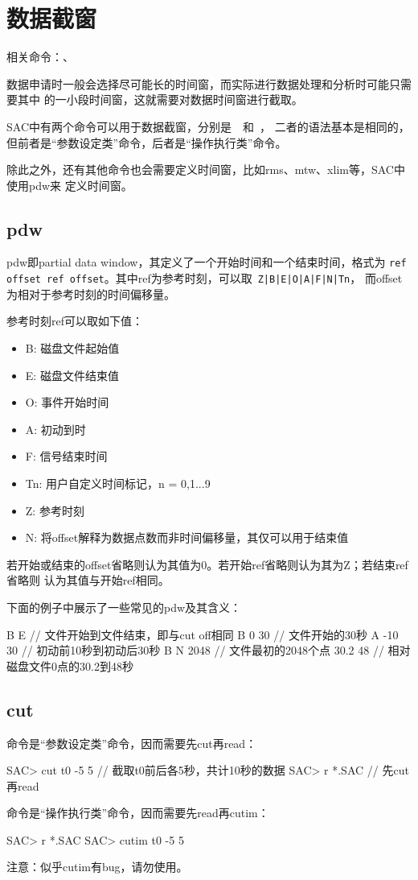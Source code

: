 \section{数据截窗}
相关命令：、

数据申请时一般会选择尽可能长的时间窗，而实际进行数据处理和分析时可能只需要其中
的一小段时间窗，这就需要对数据时间窗进行截取。

SAC中有两个命令可以用于数据截窗，分别是~~和~，
二者的语法基本是相同的，但前者是``参数设定类''命令，后者是``操作执行类''命令。

除此之外，还有其他命令也会需要定义时间窗，比如rms、mtw、xlim等，SAC中使用pdw来
定义时间窗。

\subsection{pdw}
\label{subsec:pdw}
pdw即partial data window，其定义了一个开始时间和一个结束时间，格式为
\verb+ref offset ref offset+。其中ref为参考时刻，可以取~\verb+Z|B|E|O|A|F|N|Tn+，
而offset为相对于参考时刻的时间偏移量。

参考时刻ref可以取如下值：
\begin{itemize}
\item B: 磁盘文件起始值
\item E: 磁盘文件结束值
\item O: 事件开始时间
\item A: 初动到时
\item F: 信号结束时间
\item Tn: 用户自定义时间标记，n = 0,1...9
\item Z: 参考时刻
\item N: 将offset解释为数据点数而非时间偏移量，其仅可以用于结束值
\end{itemize}

若开始或结束的offset省略则认为其值为0。若开始ref省略则认为其为Z；若结束ref省略则
认为其值与开始ref相同。

下面的例子中展示了一些常见的pdw及其含义：
\begin{SACCode}
 B E        // 文件开始到文件结束，即与cut off相同
 B 0 30     // 文件开始的30秒
 A -10 30   // 初动前10秒到初动后30秒
 B N 2048   // 文件最初的2048个点
 30.2 48    // 相对磁盘文件0点的30.2到48秒
\end{SACCode}

\subsection{cut}
命令是``参数设定类''命令，因而需要先cut再read：
\begin{SACCode}
SAC> cut t0 -5 5        // 截取t0前后各5秒，共计10秒的数据
SAC> r *.SAC            // 先cut再read
\end{SACCode}

命令是``操作执行类''命令，因而需要先read再cutim：
\begin{SACCode}
SAC> r *.SAC
SAC> cutim t0 -5 5
\end{SACCode}

注意：似乎cutim有bug，请勿使用。
